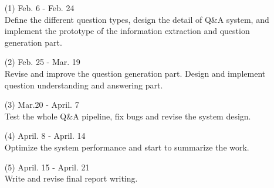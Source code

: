 \documentclass[a4page]{article}
\begin{document}
\begin{itemize}
\item[(1)]Feb. 6 - Feb. 24 \\ Define the different question types, design the detail of Q\&A system, and implement the prototype of the information extraction and question generation part.
\item[(2)]Feb. 25 - Mar. 19 \\ Revise and improve the question generation part. Design and implement question understanding and answering part.
\item[(3)]Mar.20 - April. 7 \\ Test the whole Q\&A pipeline, fix bugs and revise the system design.
\item[(4)]April. 8 - April. 14 \\ Optimize the system performance and start to summarize the work.
\item[(5)]April. 15 - April. 21 \\ Write and revise final report writing.

\end{itemize}
\end{document}
